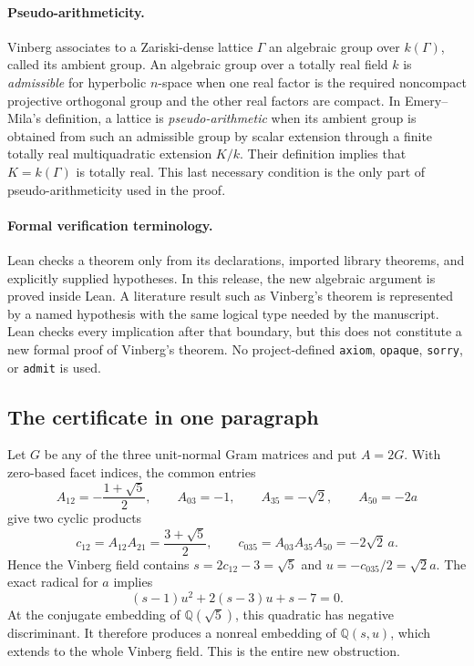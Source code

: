 \documentclass[11pt]{article}
\numberwithin{equation}{section}
\theoremstyle{definition}
\theoremstyle{remark}
\newcommand{\Q}{\mathbb{Q}}
\newcommand{\code}[1]{\texttt{#1}}
\begin{document}
\paragraph{Pseudo-arithmeticity.}
Vinberg associates to a Zariski-dense lattice \(\Gamma\) an algebraic group
over \(k(\Gamma)\), called its ambient group.  An algebraic group over a
totally real field \(k\) is \emph{admissible} for hyperbolic \(n\)-space when
one real factor is the required noncompact projective orthogonal group and
the other real factors are compact.  In Emery--Mila's definition, a lattice
is \emph{pseudo-arithmetic} when its ambient group is obtained from such an
admissible group by scalar extension through a finite totally real multiquadratic
extension \(K/k\).  Their definition implies that \(K=k(\Gamma)\) is totally
real.  This last necessary condition is the only part of
pseudo-arithmeticity used in the proof.

\paragraph{Formal verification terminology.}
Lean checks a theorem only from its declarations, imported library theorems,
and explicitly supplied hypotheses.  In this release, the new algebraic
argument is proved inside Lean.  A literature result such as Vinberg's theorem
is represented by a named hypothesis with the same logical type needed by
the manuscript.  Lean checks every implication after that boundary, but this
does not constitute a new formal proof of Vinberg's theorem.  No
project-defined \code{axiom}, \code{opaque}, \code{sorry}, or \code{admit}
is used.

\subsection{The certificate in one paragraph}
\label{subsec:certificate-preview}

Let \(G\) be any of the three unit-normal Gram matrices and put \(A=2G\).
With zero-based facet indices, the common entries
\[
 A_{12}=-\frac{1+\sqrt5}{2},\qquad
 A_{03}=-1,\qquad A_{35}=-\sqrt2,\qquad A_{50}=-2a
\]
give two cyclic products
\[
 c_{12}=A_{12}A_{21}=\frac{3+\sqrt5}{2},\qquad
 c_{035}=A_{03}A_{35}A_{50}=-2\sqrt2\,a.
\]
Hence the Vinberg field contains
\(s=2c_{12}-3=\sqrt5\) and
\(u=-c_{035}/2=\sqrt2a\).  The exact radical for \(a\) implies
\[
 (s-1)u^2+2(s-3)u+s-7=0.
\]
At the conjugate embedding of \(\Q(\sqrt5)\), this quadratic has negative
discriminant.  It therefore produces a nonreal embedding of
\(\Q(s,u)\), which extends to the whole Vinberg field.  This is the entire
new obstruction.
\end{document}
